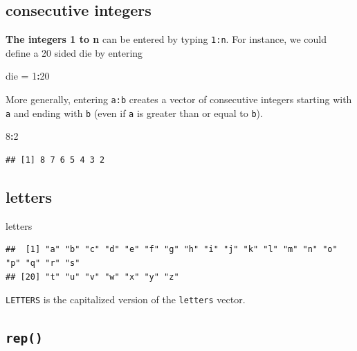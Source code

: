 \documentclass[
]{book}
\newenvironment{Shaded}{\begin{snugshade}}{\end{snugshade}}
\newcommand{\DecValTok}[1]{\textcolor[rgb]{0.00,0.00,0.81}{#1}}
\newcommand{\NormalTok}[1]{#1}
\newcommand{\OtherTok}[1]{\textcolor[rgb]{0.56,0.35,0.01}{#1}}
\newcommand{\SpecialCharTok}[1]{\textcolor[rgb]{0.81,0.36,0.00}{\textbf{#1}}}
\theoremstyle{definition}
\theoremstyle{definition}
\theoremstyle{definition}
\theoremstyle{definition}
\theoremstyle{remark}
\begin{document}
\subsection*{consecutive integers}\label{consecutive-integers}

\textbf{The integers 1 to n} can be entered by typing \texttt{1:n}. For instance, we could define a 20 sided die by entering

\begin{Shaded}
\begin{Highlighting}[]
\NormalTok{die }\OtherTok{=} \DecValTok{1}\SpecialCharTok{:}\DecValTok{20}
\end{Highlighting}
\end{Shaded}

More generally, entering \texttt{a:b} creates a vector of consecutive integers starting with \texttt{a} and ending with \texttt{b} (even if \texttt{a} is greater than or equal to \texttt{b}).

\begin{Shaded}
\begin{Highlighting}[]
\DecValTok{8}\SpecialCharTok{:}\DecValTok{2}
\end{Highlighting}
\end{Shaded}

\begin{verbatim}
## [1] 8 7 6 5 4 3 2
\end{verbatim}

\subsection*{letters}\label{letters}

\begin{Shaded}
\begin{Highlighting}[]
\NormalTok{letters}
\end{Highlighting}
\end{Shaded}

\begin{verbatim}
##  [1] "a" "b" "c" "d" "e" "f" "g" "h" "i" "j" "k" "l" "m" "n" "o" "p" "q" "r" "s"
## [20] "t" "u" "v" "w" "x" "y" "z"
\end{verbatim}

\texttt{LETTERS} is the capitalized version of the \texttt{letters} vector.

\subsection*{\texorpdfstring{\texttt{rep()}}{rep()}}\label{rep}
\end{document}
